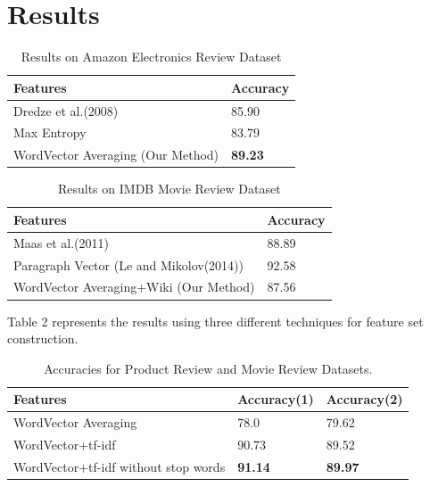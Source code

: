 \def\DevnagVersion{2.15}\documentclass[11pt]{article}
\begin{document}

\section{Results}

\begin {table}[H]
\small
\begin{tabular}{ | p{5.5cm} | l | }
\hline
\textbf{Features} & \textbf{Accuracy} \\ \hline
Dredze et al.(2008) & 85.90\\ \hline
Max Entropy & 83.79\\ \hline
WordVector Averaging (Our Method) & \textbf{89.23}\\ \hline
\end{tabular}
\caption {Results on Amazon Electronics Review Dataset}
\end{table}

\begin {table}[H]
\small
\begin{tabular}{ | p{5.5cm} | l | }
\hline
\textbf{Features} & \textbf{Accuracy} \\ \hline
Maas et al.(2011) & 88.89\\ \hline
Paragraph Vector (Le and Mikolov(2014)) & 92.58\\ \hline
WordVector Averaging+Wiki (Our Method) & 87.56\\ \hline
\end{tabular}
\caption {Results on IMDB Movie Review Dataset}
\end{table}

Table 2 represents the results using three different techniques for feature set construction.
\begin {table}[H]
\small
\begin{tabular}{ | p{3cm} | l | l | }
\hline
\textbf{Features} & \textbf{Accuracy(1)} & \textbf{Accuracy(2)} \\ \hline
WordVector Averaging & 78.0 & 79.62\\ \hline
WordVector+tf-idf & 90.73 & 89.52\\ \hline
WordVector+tf-idf without stop words & \textbf{91.14} & \textbf{89.97}\\ \hline
\end{tabular}
\caption {Accuracies for Product Review and Movie Review Datasets.}
\end{table}
\end{document}
